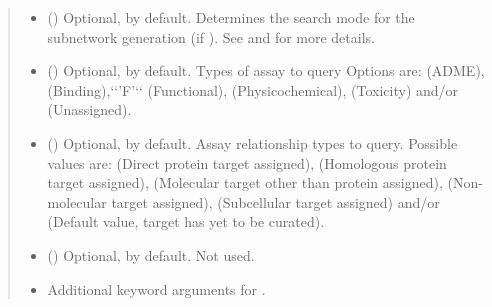 \documentclass[letterpaper,10pt,english]{sphinxmanual}
\begin{document}
\begin{fulllineitems}
\begin{fulllineitems}
\begin{quote}
\begin{description}
\begin{itemize}
\item {} 
 () \textendash{} Optional,  by default. Determines the search mode
for the subnetwork generation (if ). See
{\hyperref[\detokenize{reference:pypath.main.PyPath.search_attr_or}]{}} and
{\hyperref[\detokenize{reference:pypath.main.PyPath.search_attr_and}]{}} for more
details.

\item {} 
 () \textendash{} Optional, \sphinxcode{\sphinxupquote{{[}'B', 'F'{]}}} by default. Types of assay to query
Options are:  (ADME),  (Binding),{}`{}`’F’{}`{}`
(Functional),  (Physicochemical),  (Toxicity)
and/or  (Unassigned).

\item {} 
 () \textendash{} Optional, \sphinxcode{\sphinxupquote{{[}'D', 'H'{]}}} by default. Assay relationship
types to query. Possible values are:  (Direct protein
target assigned),  (Homologous protein target
assigned),  (Molecular target other than protein
assigned),  (Non-molecular target assigned), 
(Subcellular target assigned) and/or  (Default value,
target has yet to be curated).

\item {} 
 () \textendash{} Optional,  by default. Not used.

\item {} 
 \textendash{} Additional keyword arguments for
.


\end{itemize}
\end{description}
\end{quote}
\end{fulllineitems}
\end{fulllineitems}
\end{document}
